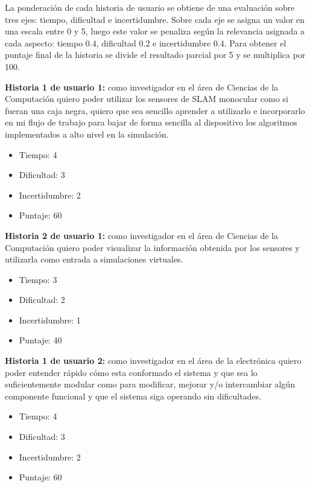 \documentclass[
11pt, %
codirector, %
]{charter}
\begin{document}
La ponderación de cada historia de usuario se obtiene de una evaluación sobre tres ejes: tiempo, dificultad e incertidumbre. Sobre cada eje se asigna un valor en una escala entre 0 y 5, luego este valor se penaliza según la relevancia asignada a cada aspecto: tiempo 0.4, dificultad 0.2 e incertidumbre 0.4. Para obtener el puntaje final de la historia se divide el resultado parcial por 5 y se multiplica por 100.

\textbf{Historia 1 de usuario 1:} como investigador en el área de Ciencias de la Computación quiero poder utilizar los sensores de SLAM monocular como si fueran una caja negra, quiero que sea sencillo aprender a utilizarlo e incorporarlo en mi flujo de trabajo para bajar de forma sencilla al dispositivo los algoritmos implementados a alto nivel en la simulación.

\begin{itemize}
	\item Tiempo: 4
	\item Dificultad: 3
	\item Incertidumbre: 2
	\item Puntaje: 60
\end{itemize}

\textbf{Historia 2 de usuario 1:} como investigador en el área de Ciencias de la Computación quiero poder visualizar la información obtenida por los sensores y utilizarla como entrada a simulaciones virtuales.

\begin{itemize}
	\item Tiempo: 3
	\item Dificultad: 2
	\item Incertidumbre: 1
	\item Puntaje: 40
\end{itemize}

\textbf{Historia 1 de usuario 2:} como investigador en el área de la electrónica quiero poder entender rápido cómo esta conformado el sistema y que sea lo suficientemente modular como para modificar, mejorar y/o intercambiar algún componente funcional y que el sistema siga operando sin dificultades.

\begin{itemize}
	\item Tiempo: 4
	\item Dificultad: 3
	\item Incertidumbre: 2
	\item Puntaje: 60
\end{itemize}
\end{document}
